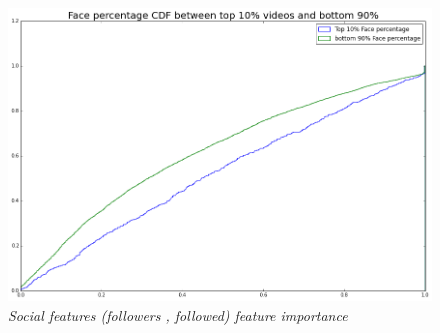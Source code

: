 \begin{figure}[!htb]
	\centering
	\includegraphics[width=\columnwidth]{plots/FacepercentageInsta.png}
	\caption{\textsl{Social features (followers , followed) feature importance}}
	\label{fig:Face_Thirds}
\end{figure}